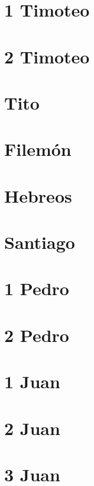 \chapter{1 Timoteo}



\chapter{2 Timoteo}



\chapter{Tito}



\chapter{Filemón}



\chapter{Hebreos}



\chapter{Santiago}



\chapter{1 Pedro}



\chapter{2 Pedro}



\chapter{1 Juan}



\chapter{2 Juan}



\chapter{3 Juan}



